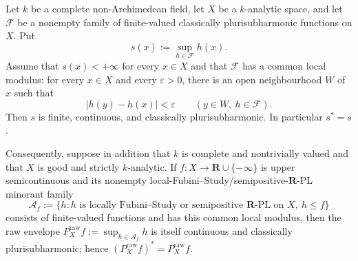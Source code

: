 \begin{proposition}
\label{prop:p031-modulus-controlled-envelope-candidate}
Let $k$ be a complete non-Archimedean field, let $X$ be a $k$-analytic
space, and let $\mathcal F$ be a nonempty family of finite-valued
classically plurisubharmonic functions on $X$.  Put
\[
 s(x):=\sup_{h\in\mathcal F}h(x).
\]
Assume that $s(x)<+\infty$ for every $x\in X$ and that $\mathcal F$ has a
common local modulus: for every $x\in X$ and every $\varepsilon>0$, there is
an open neighbourhood $W$ of $x$ such that
\[
 |h(y)-h(x)|<\varepsilon
 \qquad(y\in W,\ h\in\mathcal F).
\]
Then $s$ is finite, continuous, and classically plurisubharmonic.  In
particular $s^*=s$.

Consequently, suppose in addition that $k$ is complete and nontrivially
valued and that $X$ is good and strictly $k$-analytic.  If
$f:X\to\mathbf R\cup\{-\infty\}$ is upper semicontinuous and its nonempty
local-Fubini--Study/semipositive-$\mathbf R$-PL minorant family
\[
 \mathcal A_f:=\{h:h\text{ is locally Fubini--Study or semipositive
 $\mathbf R$-PL on }X,\ h\leq f\}
\]
consists of finite-valued functions and has this common local modulus, then
the raw envelope $P_X^{\mathrm{raw}}f:=\sup_{h\in\mathcal A_f}h$ is itself
continuous and classically plurisubharmonic; hence
$(P_X^{\mathrm{raw}}f)^*=P_X^{\mathrm{raw}}f$.
\end{proposition}
